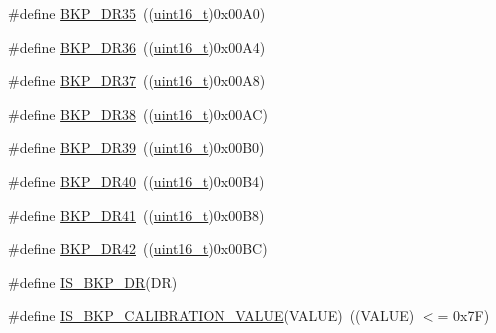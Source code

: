 \begin{DoxyCompactItemize}
\item 
\#define \hyperlink{group___data___backup___register_ga54e494fd651d2e1970ab7e5d6528af21}{B\+K\+P\+\_\+\+D\+R35}~((\hyperlink{_p_e___types_8h_a1f1825b69244eb3ad2c7165ddc99c956}{uint16\+\_\+t})0x00\+A0)
\item 
\#define \hyperlink{group___data___backup___register_ga212028eb8d981756b3bc78492434d19a}{B\+K\+P\+\_\+\+D\+R36}~((\hyperlink{_p_e___types_8h_a1f1825b69244eb3ad2c7165ddc99c956}{uint16\+\_\+t})0x00\+A4)
\item 
\#define \hyperlink{group___data___backup___register_ga6c11b636a33c5b352d267355e502b34d}{B\+K\+P\+\_\+\+D\+R37}~((\hyperlink{_p_e___types_8h_a1f1825b69244eb3ad2c7165ddc99c956}{uint16\+\_\+t})0x00\+A8)
\item 
\#define \hyperlink{group___data___backup___register_ga88f4c7dd39ba83b66159b2c808275a09}{B\+K\+P\+\_\+\+D\+R38}~((\hyperlink{_p_e___types_8h_a1f1825b69244eb3ad2c7165ddc99c956}{uint16\+\_\+t})0x00\+A\+C)
\item 
\#define \hyperlink{group___data___backup___register_ga1656f56588b474b1f48bb96380cdfd4a}{B\+K\+P\+\_\+\+D\+R39}~((\hyperlink{_p_e___types_8h_a1f1825b69244eb3ad2c7165ddc99c956}{uint16\+\_\+t})0x00\+B0)
\item 
\#define \hyperlink{group___data___backup___register_ga17e0d382ac43abed1663846b5aecc09a}{B\+K\+P\+\_\+\+D\+R40}~((\hyperlink{_p_e___types_8h_a1f1825b69244eb3ad2c7165ddc99c956}{uint16\+\_\+t})0x00\+B4)
\item 
\#define \hyperlink{group___data___backup___register_gae1e184afc030987396716ddfad008e81}{B\+K\+P\+\_\+\+D\+R41}~((\hyperlink{_p_e___types_8h_a1f1825b69244eb3ad2c7165ddc99c956}{uint16\+\_\+t})0x00\+B8)
\item 
\#define \hyperlink{group___data___backup___register_ga557d35e490957616b02672005f516542}{B\+K\+P\+\_\+\+D\+R42}~((\hyperlink{_p_e___types_8h_a1f1825b69244eb3ad2c7165ddc99c956}{uint16\+\_\+t})0x00\+B\+C)
\item 
\#define \hyperlink{group___data___backup___register_gaff069cf5458ccf0a94e2f784e2d610b8}{I\+S\+\_\+\+B\+K\+P\+\_\+\+DR}(DR)
\item 
\#define \hyperlink{group___data___backup___register_gafc3386eaa5383b64e9d706e5fe8dc1cf}{I\+S\+\_\+\+B\+K\+P\+\_\+\+C\+A\+L\+I\+B\+R\+A\+T\+I\+O\+N\+\_\+\+V\+A\+L\+UE}(V\+A\+L\+UE)~((V\+A\+L\+UE) $<$= 0x7\+F)
\end{DoxyCompactItemize}
